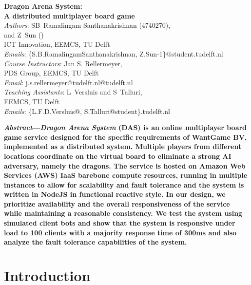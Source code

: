 \documentclass[a4paper]{IEEEtran}
\begin{document}
  
  \setlength{\tabcolsep}{10pt}
  \renewcommand{\arraystretch}{1.25}
  
  \begin{center}
    \textbf{\Large{
      Dragon Arena System: \\ A distributed multiplayer board game
    }}\\
    \vspace{0.25cm}
    \emph{Authors}: SB~Ramalingam Santhanakrishnan (4740270), \\ and Z~Sun () \\
    ICT Innovation, EEMCS, TU Delft\\
    \emph{Emails}: \{S.B.RamalingamSanthanakrishnan, Z.Sun-1\}@student.tudelft.nl\\
    \vspace{0.2cm}
    \emph{Course Instructors}: Jan S. Rellermeyer,\\
    PDS Group, EEMCS, TU Delft\\
    \emph{Email}: j.s.rellermeyer@tudelft.nl@tudelft.nl\\
    \vspace{0.2cm}
    \emph{Teaching Assistants}: L~Versluis and S~Talluri,\\
    EEMCS, TU Delft\\
    \emph{Emails}: {\{L.F.D.Versluis@, S.Talluri@student\}.tudelft.nl}\\
  \end{center}
  
  \vspace{0.2cm}
  
  \textbf{
    \emph{Abstract}---\emph{Dragon Arena System} (DAS) is an online multiplayer board game service designed for the specific requirements of WantGame BV, implemented as a distributed system. Multiple players from different locations coordinate on the virtual board to eliminate a strong AI adversary, namely the dragons. The service is hosted on Amazon Web Services (AWS) IaaS barebone compute resources, running in multiple instances to allow for scalability and fault tolerance and the system is written in NodeJS in functional reactive style. In our design, we prioritize availability and the overall responsiveness of the service while maintaining a reasonable consistency. We test the system using simulated client bots and show that the system is responsive under load to 100 clients with a majority response time of 300ms and also analyze the fault tolerance capabilities of the system. 
  }
  
  \section{Introduction}
  
\end{document}
